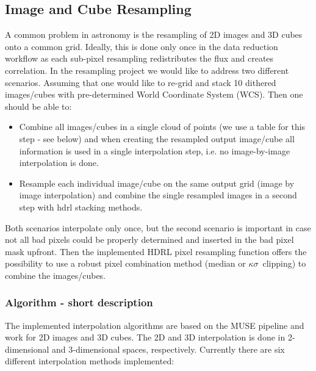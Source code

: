 \newpage

\subsection{Image and Cube Resampling}
\label{resampling:main}

A common problem in astronomy is the resampling of 2D images and 3D cubes onto a
common grid. Ideally, this is done only once in the data reduction workflow as
each sub-pixel resampling redistributes the flux and creates correlation. In the
resampling \HDRL project we would like to address two different
scenarios. Assuming that one would like to re-grid and stack 10 dithered images/cubes
with pre-determined World Coordinate System (WCS). Then one should be able to:

\begin{itemize}
\item Combine all images/cubes in a single cloud of points (we use a
table for this step - see below) and when creating the resampled output
image/cube all information is used in a single interpolation step, i.e. no
image-by-image interpolation is done.
\item Resample each individual image/cube on the same output grid (image by image
interpolation) and combine the single resampled images in a second step with
hdrl stacking methods.
\end{itemize}
Both scenarios interpolate only once, but the second scenario is important in
case not all bad pixels could be properly determined and inserted in the bad
pixel mask upfront. Then the implemented HDRL pixel resampling function offers the possibility to use a robust pixel
combination method (median or $\kappa\sigma$~clipping) to combine the
images/cubes. 

\subsubsection{Algorithm - short description}
\label{resampling:algorithms}

The implemented interpolation algorithms are based on the MUSE pipeline and work
for 2D images and 3D cubes. The 2D and 3D interpolation is done in 2-dimensional
and 3-dimensional spaces, respectively. Currently there are six different
interpolation methods implemented:

